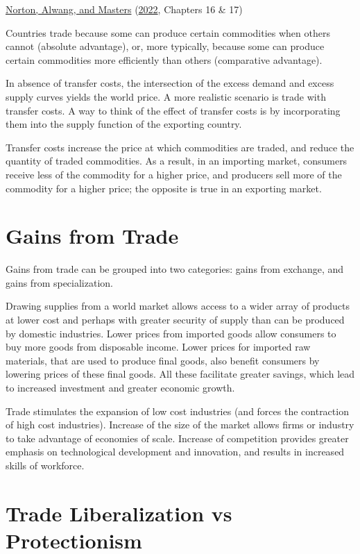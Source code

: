 \documentclass[
  oneside]{book}
\begin{document}
\protect\hyperlink{ref-norton2022}{Norton, Alwang, and Masters} (\protect\hyperlink{ref-norton2022}{2022}, Chapters 16 \& 17)

Countries trade because some can produce certain commodities when others cannot (absolute advantage), or, more typically, because some can produce certain commodities more efficiently than others (comparative advantage).

In absence of transfer costs, the intersection of the excess demand and excess supply curves yields the world price. A more realistic scenario is trade with transfer costs. A way to think of the effect of transfer costs is by incorporating them into the supply function of the exporting country.

Transfer costs increase the price at which commodities are traded, and reduce the quantity of traded commodities. As a result, in an importing market, consumers receive less of the commodity for a higher price, and producers sell more of the commodity for a higher price; the opposite is true in an exporting market.

\hypertarget{gains-from-trade}{%
\section{Gains from Trade}\label{gains-from-trade}}

Gains from trade can be grouped into two categories: gains from exchange, and gains from specialization.

Drawing supplies from a world market allows access to a wider array of products at lower cost and perhaps with greater security of supply than can be produced by domestic industries. Lower prices from imported goods allow consumers to buy more goods from disposable income. Lower prices for imported raw materials, that are used to produce final goods, also benefit consumers by lowering prices of these final goods. All these facilitate greater savings, which lead to increased investment and greater economic growth.

Trade stimulates the expansion of low cost industries (and forces the contraction of high cost industries). Increase of the size of the market allows firms or industry to take advantage of economies of scale. Increase of competition provides greater emphasis on technological development and innovation, and results in increased skills of workforce.

\hypertarget{trade-liberalization-vs-protectionism}{%
\section{Trade Liberalization vs Protectionism}\label{trade-liberalization-vs-protectionism}}
\end{document}
